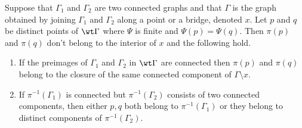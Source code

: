 \begin{lemma}\label{lem:AbelPrymSeparatesTwoConnectedComponents}
Suppose that $\Gamma_1$ and $\Gamma_2$ are two connected graphs and that $\Gamma$ is the graph obtained by joining $\Gamma_1$ and $\Gamma_2$ along a point or a bridge, denoted $x$. 
Let $p$ and $q$ be distinct points of $\wt\Gamma$ where $\Psi$ is finite and $\Psi(p) = \Psi(q)$. Then $\pi(p)$ and $\pi(q)$ don't belong to the interior of $x$ and the following hold.
\begin{enumerate}
    \item If the preimages of $\Gamma_1$ and $\Gamma_2$ in $\wt\Gamma$ are connected then $\pi(p)$ and $\pi(q)$ belong to the closure of the same connected component of $\Gamma\setminus x$.

    \item If $\pi^{-1}(\Gamma_1)$ is connected but $\pi^{-1}(\Gamma_2)$ consists of two connected components, then either $p,q$ both belong to $\pi^{-1}(\Gamma_1)$ or they belong  to distinct components of $\pi^{-1}(\Gamma_2)$.
\end{enumerate}


\end{lemma}

